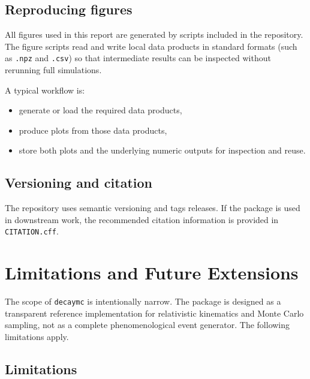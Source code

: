 \documentclass[11pt,a4paper]{article}
\begin{document}
\subsection{Reproducing figures}

All figures used in this report are generated by scripts included in the repository. The
figure scripts read and write local data products in standard formats (such as \texttt{.npz}
and \texttt{.csv}) so that intermediate results can be inspected without rerunning full
simulations.

A typical workflow is:
\begin{itemize}
  \item generate or load the required data products,
  \item produce plots from those data products,
  \item store both plots and the underlying numeric outputs for inspection and reuse.
\end{itemize}

\subsection{Versioning and citation}

The repository uses semantic versioning and tags releases. If the package is used in
downstream work, the recommended citation information is provided in \texttt{CITATION.cff}.


\section{Limitations and Future Extensions}
\label{sec:limitations}

The scope of \texttt{decaymc} is intentionally narrow. The package is designed as a
transparent reference implementation for relativistic kinematics and Monte Carlo sampling,
not as a complete phenomenological event generator. The following limitations apply.

\subsection{Limitations}
\end{document}
